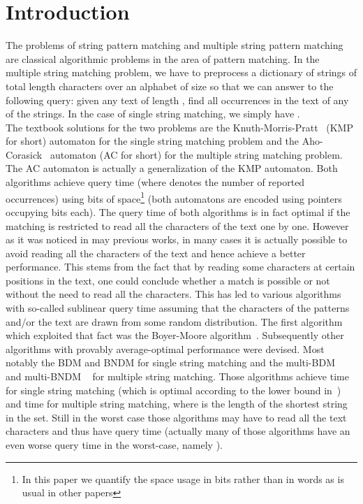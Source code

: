 \documentclass{article}
\newcommand{\?}{\mskip1.5mu}
\begin{document}
\section{Introduction}
The problems of string pattern matching and multiple string pattern matching are classical algorithmic problems in the area of pattern matching. In the multiple string matching problem, we have to preprocess a dictionary of  strings of total length  characters over an alphabet of size  so that we can answer to the following query: given any text of length , find all occurrences in the text of any of the  strings. In the case of single string matching, we simply have .
\\The textbook solutions for the two problems are the Knuth-Morris-Pratt~\cite{KMP77} (KMP for short) automaton for the single string matching problem and the Aho-Corasick~\cite{AC75} automaton (AC for short) for the multiple string matching problem. The AC automaton is actually a generalization of the KMP automaton. 
Both algorithms achieve  query time (where  denotes the number of reported occurrences) using  bits of space\footnote{In this paper we quantify the space usage in bits rather than in words as is usual in other papers} (both automatons are encoded using  pointers occupying  bits each). The query time of both algorithms is in fact optimal if the matching is restricted to read all the characters of the text one by one. However as it was noticed in may previous works, in many cases it is actually possible to avoid reading all the characters of the text and hence achieve a better performance. This stems from the fact that by reading some characters at certain positions in the text, one could conclude whether a match is possible or not without the need to read all the characters. This has led to various algorithms with so-called sublinear query time assuming that the characters of the patterns and/or the text are drawn from some random distribution. 
The first algorithm which exploited that fact was the Boyer-Moore algorithm~\cite{BM77}. Subsequently other algorithms with provably average-optimal performance were devised. Most  notably the BDM and BNDM for single string matching and the multi-BDM~\cite{CR94,CCGJLPR94} and multi-BNDM ~\cite{NR98} for multiple string matching. Those algorithms achieve  time for single string matching (which is optimal according to the lower bound in~\cite{YAO79}) and  time for multiple string matching, where  is the length of the shortest string in the set. 
Still in the worst case those algorithms may have to read all the text characters and thus have  query time (actually many of those algorithms have an even worse query time in the worst-case, namely ).  
\end{document}
